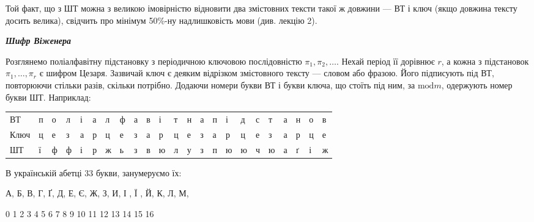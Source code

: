 Той факт, що з ШТ можна з великою імовірністю відновити два змістовних тексти
такої ж довжини --- ВТ і ключ (якщо довжина тексту досить велика), свідчить про
мінімум 50\%-ну надлишковість мови (див. лекцію 2).


\bigskip

{\centering\bfseries\itshape
Шифр Віженера
\par}


\bigskip


\bigskip

Розглянемо поліалфавітну підстановку з періодичною ключовою послідовністю  ${\pi
_{{1}},\pi _{{2}},\dots}$. Нехай період її дорівнює  ${r}$,
а кожна з підстановок  ${\pi _{{1}},\dots,\pi _{{r}}}$ є
шифром Цезаря. Зазвичай ключ є деяким відрізком змістовного тексту --- словом або
фразою. Його підписують під ВТ, повторюючи стільки разів, скільки потрібно.
Додаючи номери букви ВТ і букви ключа, що стоїть під ним, за  ${\text{mod}m}$,
одержують номер букви ШТ. Наприклад:


\bigskip


\bigskip

\begin{flushleft}
\tablehead{}
\begin{supertabular}{m{0.54135984in}m{0.17545986in}m{0.19765985in}m{0.19765985in}m{0.15805984in}m{0.16845983in}m{0.20595986in}m{0.19765985in}m{0.15805984in}m{0.16365984in}m{0.21705985in}m{0.17545986in}m{0.17545986in}m{0.15805984in}m{0.17545986in}m{0.21705985in}m{0.21705985in}m{0.16915983in}m{0.21705985in}m{0.15805984in}m{0.17545986in}m{0.17545986in}m{0.20595986in}}
ВТ  &
п &
о &
л &
і &
а &
л &
ф &
а &
в &
і &
т &
н &
а &
п &
і &
д &
с &
т &
а &
н &
о &
в\\
Ключ &
ц &
е &
з &
а &
р &
ц &
е &
з &
а &
р &
ц &
е &
з &
а &
р &
ц &
е &
з &
а &
р &
ц &
е\\
ШТ &
ї &
ф &
ф &
і &
р &
ж &
ь &
з &
в &
ю &
л &
у &
з &
п &
ю &
ю &
ч &
ю &
а &
ґ &
і &
ж\\
\end{supertabular}
\end{flushleft}

\bigskip

В українській абетці 33 букви, занумеруємо їх: 


\bigskip

{\centering
А,   Б,   В,   Г,  Ґ,  Д,   Е,   Є,   Ж,   З,   И,   І ,    Ї ,   Й,   К,   Л,  
М,
\par}

 0    1    2    3  4  5  6   7    8  9  10   11   12  13   14   15  16  

